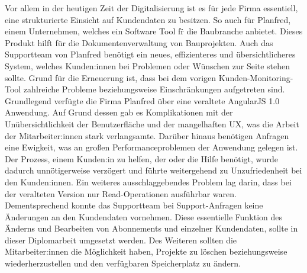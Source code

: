 Vor allem in der heutigen Zeit der Digitalisierung ist es f\"ur jede Firma essentiell, eine strukturierte Einsicht auf Kundendaten zu besitzen. So auch für Planfred, einem Unternehmen, welches ein Software Tool f\"r die Baubranche anbietet. Dieses Produkt hilft für die Dokumentenverwaltung von Bauprojekten. Auch das Supportteam von Planfred benötigt ein neues, effizienteres und \"ubersichtlicheres System, welches Kunden:innen bei Problemen oder W\"unschen zur Seite stehen sollte. Grund für die Erneuerung ist, dass bei dem vorigen Kunden-Monitoring-Tool zahlreiche Probleme beziehungsweise Einschränkungen aufgetreten sind.
\newline
Grundlegend verf\"ugte die Firma Planfred \"uber eine veraltete AngularJS 1.0 Anwendung. Auf Grund dessen gab es Komplikationen mit der Un\"ubersichtlichkeit der Benutzerfläche und der mangelhaften UX, was die Arbeit der Mitarbeiter:innen stark verlangsamte. Dar\"uber hinaus benötigen Anfragen eine Ewigkeit, was an großen Performanceproblemen der Anwendung gelegen ist. Der Prozess, einem Kunden:in zu helfen, der oder die Hilfe benötigt, wurde dadurch unnötigerweise verzögert und f\"uhrte weitergehend zu Unzufriedenheit bei den Kunden:innen.
\newline
Ein weiteres ausschlaggebendes Problem lag darin, dass bei der veralteten Version nur Read-Operationen ausf\"uhrbar waren. Dementsprechend konnte das Supportteam bei Support-Anfragen keine Änderungen an den Kundendaten vornehmen. Diese essentielle Funktion des Änderns und Bearbeiten von Abonnements und einzelner Kundendaten, sollte in dieser Diplomarbeit umgesetzt werden. Des Weiteren sollten die Mitarbeiter:innen die Möglichkeit haben, Projekte zu löschen beziehungsweise wiederherzustellen und den verf\"ugbaren Speicherplatz zu ändern.
\newpage